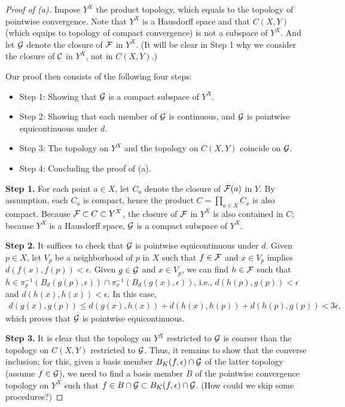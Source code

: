 \begin{proof}[Proof of (a)]
    Impose $Y^X$ the product topology, which equals to the topology of pointwise convergence.
    Note that $Y^X$ is a Hausdorff space and that $C(X, Y)$ (which equips to topology of compact convergence) is not a subspace of $Y^X$.
    And let ${\mathcal{G}}$ denote the closure of ${\mathcal{F}}$ in $Y^X$. (It will be clear in Step 1 why we consider the closure of ${\mathcal{C}}$ in $Y^X$, not in $C(X, Y)$.)

    Our proof then consists of the following four steps:
    \begin{itemize}
        \item
        {
            Step 1: Showing that ${\mathcal{G}}$ is a compact subspace of $Y^X$.
        }
        \item
        {
            Step 2: Showing that each member of ${\mathcal{G}}$ is continuous, and ${\mathcal{G}}$ is pointwise equicontinuous under $d$.
        }
        \item
        {
            Step 3: The topology on $Y^X$ and the topology on $C(X, Y)$ coincide on ${\mathcal{G}}$.
        }
        \item
        {
            Step 4: Concluding the proof of (a).
        }
    \end{itemize}

    \textbf{Step 1.}
    For each point $a\in X$, let $C_a$ denote the closure of ${\mathcal{F}}(a)$ in $Y$.
    By assumption, each $C_a$ is compact, hence the product $C=\prod_{a\in X} C_x$ is also compact.
    Because ${\mathcal{F}}\subset C\subset Y^X$, the closure of ${\mathcal{F}}$ in $Y^X$ is also contained in $C$; because $Y^X$ is a Hausdorff space, ${\mathcal{G}}$ is a compact subspace of $Y^X$.

    \textbf{Step 2.}
    It suffices to check that ${\mathcal{G}}$ is pointwise equicontinuous under $d$.
    Given $p\in X$, let $V_p$ be a neighborhood of $p$ in $X$ such that $f\in{\mathcal{F}}$ and $x\in V_p$ implies $d(f(x), f(p))<\epsilon$.
    Given $g\in{\mathcal{G}}$ and $x\in V_p$, we can find $h\in{\mathcal{F}}$ such that $h\in\pi_p^{-1}(B_d(g(p), \epsilon))\cap\pi_x^{-1}(B_d(g(x), \epsilon))$, i.e., $d(h(p), g(p))<\epsilon$ and $d(h(x), h(x))<\epsilon$.
    In this case,
    \begin{align*}
        d(g(x), g(p))\leq d(g(x), h(x))+d(h(x), h(p))+d(h(p), g(p))<3\epsilon,
    \end{align*}
    which proves that ${\mathcal{G}}$ is pointwise equicontinuous.

    \textbf{Step 3.}
    It is clear that the topology on $Y^X$ restricted to ${\mathcal{G}}$ is coarser than the topology on $C(X, Y)$ restricted to ${\mathcal{G}}$.
    Thus, it remains to show that the converse inclusion; for this, given a basis member $B_K(f, \epsilon)\cap {\mathcal{G}}$ of the latter topology (assume $f\in{\mathcal{G}}$), we need to find a basis member $B$ of the pointwise convergence topology on $Y^X$ such that $f\in B\cap{\mathcal{G}}\subset B_K(f, \epsilon)\cap{\mathcal{G}}$. (How could we skip some procedures?)


\end{proof}
